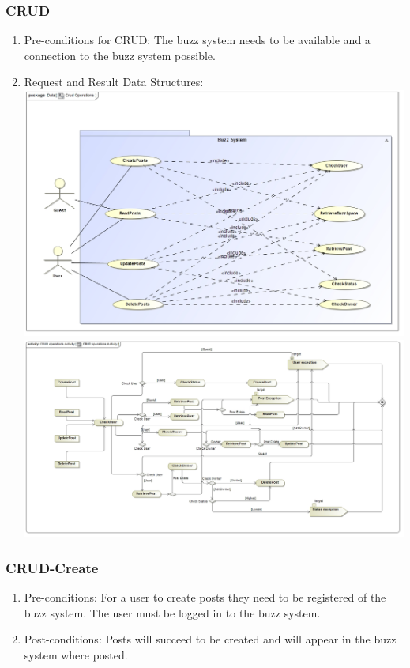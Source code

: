 \documentclass[hidelinks, 12pt, oneside]{article}
\begin{document}
\subsubsection{CRUD}
\begin{enumerate}
 \item Pre-conditions for CRUD: The buzz system needs to be available and a connection to the buzz system possible.
 
  \item Request and Result Data Structures: \\
 \includegraphics[scale=0.3]{CRUDOperations}\\
 \includegraphics[scale=0.3]{CRUDOperationsActivity} 
\end{enumerate}
\subsubsection{CRUD-Create}
\begin{enumerate}
 \item Pre-conditions: For a user to create posts they need to be registered of the buzz system. The user must be logged in to the buzz system.
 \\
 \item Post-conditions: Posts will succeed to be created and will appear in the buzz system where posted.
  \\
 
\end{enumerate}
\end{document}
